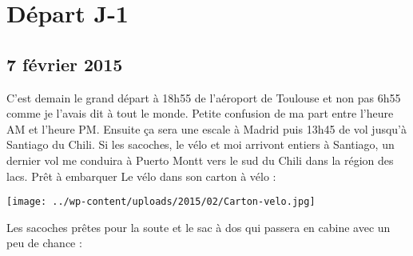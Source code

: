 \chapter{Départ J-1}
\section*{7 février 2015}
C'est demain le grand départ à 18h55 de l'aéroport de Toulouse et non pas 6h55 comme je l'avais dit à tout le monde. Petite confusion de ma part entre l'heure AM et l'heure PM. \newline
 Ensuite ça sera une escale à Madrid puis 13h45 de vol jusqu'à Santiago du Chili. Si les sacoches, le vélo et moi arrivont entiers à Santiago, un dernier vol me conduira à Puerto Montt vers le sud du Chili dans la région des lacs. \newline
 Prêt à embarquer \newline
 Le vélo dans son carton à vélo : \newline
 \newline
\centerline{\texttt{[image: ../wp-content/uploads/2015/02/Carton-velo.jpg]} } 
 \newline
 Les sacoches prêtes pour la soute et le sac à dos qui passera en cabine avec un peu de chance : \newline
 